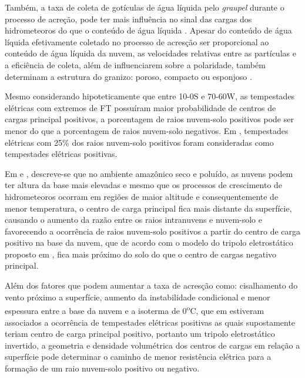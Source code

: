 Também, a taxa de coleta de gotículas de água líquida pelo \textit{graupel} durante o processo de acreção, pode ter mais influência no sinal das cargas dos hidrometeoros do que o conteúdo de água líquida \cite{jayaratne1983,saunders1991effect,brooks1997,Takahashi2002}. 
Apesar do conteúdo de água líquida efetivamente coletado no processo de acresção ser proporcional ao conteúdo de água líquida da nuvem, as velocidades relativas entre as partículas e a eficiência de coleta, além de influenciarem sobre a polaridade, também determinam a estrutura do granizo: poroso, compacto ou esponjoso \cite[p.~335]{mason1971_2ed}.  
 
Mesmo considerando hipoteticamente que entre 10-0S e 70-60W, as tempestades elétricas com extremos de FT possuíram maior probabilidade de centros de cargas principal positivos, a porcentagem de raios nuvem-solo  positivos pode ser menor do que a porcentagem de raios nuvem-solo negativos. Em , tempestades elétricas com 25\% dos raios nuvem-solo positivos foram consideradas como tempestades elétricas positivas.

Em  e , descreve-se que no ambiente amazônico seco e poluído, as nuvens podem ter altura da base mais elevadas e mesmo que os processos de crescimento de hidrometeoros ocorram em regiões de maior altitude e consequentemente de menor temperatura, o centro de carga principal fica mais distante da superfície, causando  o aumento da razão entre os raios intranuvens e nuvem-solo e favorecendo a ocorrência de raios nuvem-solo positivos a partir do centro de carga positivo na base da nuvem, que de acordo com o modelo do tripolo eletrostático proposto em , fica mais próximo do solo do que o centro de cargas negativo principal.


Além  dos fatores que podem aumentar a taxa de acresção como: cisalhamento do vento próximo a superfície, aumento da instabilidade condicional e menor espessura entre a base da nuvem e a isoterma de 0\textsuperscript{o}C, que em  estiveram associados a ocorrência de tempestades elétricas positivas as quais supostamente teriam centro de carga principal positivo, portanto um tripolo eletrostático invertido, a geometria e densidade volumétrica dos centros de cargas em relação a superfície pode determinar o caminho de menor resistência elétrica para a formação de um raio nuvem-solo positivo ou negativo.

